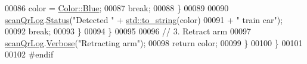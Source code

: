 \begin{DoxyCode}
00086                         color = \hyperlink{definitions_8hpp_abc05a0f46084a3477cf5d5c939ff1436a9594eec95be70e7b1710f730fdda33d9}{Color::Blue};
00087                         \textcolor{keywordflow}{break};
00088                 \}
00089 
00090                 \hyperlink{namespaceChipChipArray_ab5c6290951637c25a5422707020fb3a8}{scanQrLog}.\hyperlink{classChipChipArray_1_1Log_a66575b6e94c6112e4cefa5736cb996e0}{Status}(\textcolor{stringliteral}{"Detected "} + \hyperlink{namespacestd_aa5ddf582a1c96ffe258c997be9a294a3}{std::to\_string}(color)
00091                         + \textcolor{stringliteral}{" train car"});
00092                 \textcolor{keywordflow}{break};
00093             \}
00094         \}
00095 
00096         \textcolor{comment}{// 3. Retract arm}
00097         \hyperlink{namespaceChipChipArray_ab5c6290951637c25a5422707020fb3a8}{scanQrLog}.\hyperlink{classChipChipArray_1_1Log_a154a5f38d9c7a767693b242684a3d4d9}{Verbose}(\textcolor{stringliteral}{"Retracting arm"});        
00098         \textcolor{keywordflow}{return} color;
00099     \}
00100 \}
00101 
00102 \textcolor{preprocessor}{#endif}
\end{DoxyCode}
